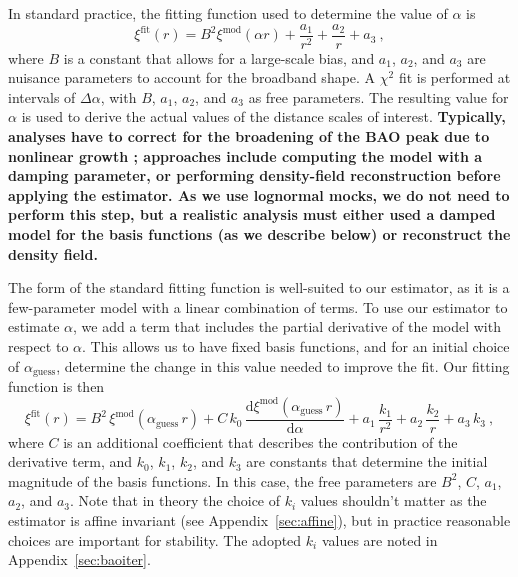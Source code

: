 \documentclass[modern]{aastex62}
\newcommand{\dd}{\mathrm{d}}
\newcommand{\new}[1]{\textbf{#1}}
\begin{document}
In standard practice, the fitting function used to determine the value of $\alpha$ is 
\begin{equation}
\xi^{\mathrm{fit}}(r) = B^2 \xi^{\mathrm{mod}}(\alpha r) + \frac{a_1}{r^2} + \frac{a_2}{r} + a_3 ~,
\end{equation}
where $B$ is a constant that allows for a large-scale bias, and $a_1$, $a_2$, and $a_3$ are nuisance parameters to account for the broadband shape.
A $\chi^2$ fit is performed at intervals of $\Delta \alpha$, with $B$, $a_1$, $a_2$, and $a_3$ as free parameters. 
The resulting value for $\alpha$ is used to derive the actual values of the distance scales of interest.
\new{Typically, analyses have to correct for the broadening of the BAO peak due to nonlinear growth \citep{Eisenstein2007}; approaches include computing the model with a damping parameter, or performing density-field reconstruction before applying the estimator.
As we use lognormal mocks, we do not need to perform this step, but a realistic analysis must either used a damped model for the basis functions (as we describe below) or reconstruct the density field.}

The form of the standard fitting function is well-suited to our estimator, as it is a few-parameter model with a linear combination of terms.
To use our estimator to estimate $\alpha$, we add a term that includes the partial derivative of the model with respect to $\alpha$.
This allows us to have fixed basis functions, and for an initial choice of $\alpha_\mathrm{guess}$, determine the change in this value needed to improve the fit. 
Our fitting function is then
\begin{equation} \label{eq:baoiter_fit}
\xi^\mathrm{fit}(r) = B^2\,\xi^\mathrm{mod}(\alpha_\mathrm{guess}\,r) + C\,k_0\,\frac{\dd \xi^\mathrm{mod}(\alpha_\mathrm{guess}\,r)}{\dd \alpha} + a_1\,\frac{k_1}{r^2} + a_2\,\frac{k_2}{r} + a_3\,k_3 ~,
\end{equation}
where $C$ is an additional coefficient that describes the contribution of the derivative term, and $k_0$, $k_1$, $k_2$, and $k_3$ are constants that determine the initial magnitude of the basis functions.
In this case, the free parameters are $B^2$, $C$, $a_1$, $a_2$, and $a_3$.
Note that in theory the choice of $k_i$ values shouldn't matter as the estimator is affine invariant (see Appendix~\ref{sec:affine}), but in practice reasonable choices are important for stability.
The adopted $k_i$ values are noted in Appendix~\ref{sec:baoiter}.
\end{document}
